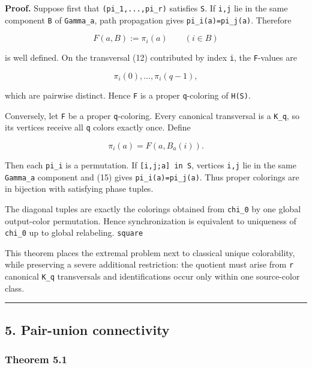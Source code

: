 \textbf{Proof.} Suppose first that \texttt{(pi\_1,...,pi\_r)} satisfies
\texttt{S}. If \texttt{i,j} lie in the same component \texttt{B} of
\texttt{Gamma\_a}, path propagation gives \texttt{pi\_i(a)=pi\_j(a)}.
Therefore

\[
F(a,B):=\pi_i(a)\qquad(i\in B)
\tag{14}
\]

is well defined. On the transversal (12) contributed by index
\texttt{i}, the \texttt{F}-values are

\[
\pi_i(0),\ldots,\pi_i(q-1),
\]

which are pairwise distinct. Hence \texttt{F} is a proper
\texttt{q}-coloring of \texttt{H(S)}.

Conversely, let \texttt{F} be a proper \texttt{q}-coloring. Every
canonical transversal is a \texttt{K\_q}, so its vertices receive all
\texttt{q} colors exactly once. Define

\[
\pi_i(a)=F(a,B_a(i)).
\tag{15}
\]

Then each \texttt{pi\_i} is a permutation. If
\texttt{{[}i,j;a{]}\ in\ S}, vertices \texttt{i,j} lie in the same
\texttt{Gamma\_a} component and (15) gives \texttt{pi\_i(a)=pi\_j(a)}.
Thus proper colorings are in bijection with satisfying phase tuples.

The diagonal tuples are exactly the colorings obtained from
\texttt{chi\_0} by one global output-color permutation. Hence
synchronization is equivalent to uniqueness of \texttt{chi\_0} up to
global relabeling. \texttt{square}

This theorem places the extremal problem next to classical unique
colorability, while preserving a severe additional restriction: the
quotient must arise from \texttt{r} canonical \texttt{K\_q} transversals
and identifications occur only within one source-color class.

\begin{center}\rule{0.5\linewidth}{0.5pt}\end{center}

\hypertarget{pair-union-connectivity}{%
\subsection{5. Pair-union connectivity}\label{pair-union-connectivity}}

\hypertarget{theorem-5.1}{%
\subsubsection{Theorem 5.1}\label{theorem-5.1}}


